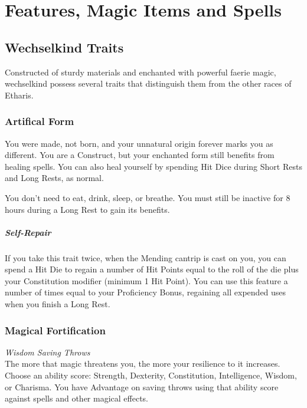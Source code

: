 \documentclass[letterpaper,openany,oneside,twocolumn]{book}
\begin{document}
\onecolumn


\rendercharactersheet

\renderbackgroundsheet

\renderspellsheet


\restoregeometry
\twocolumn

\chapter*{Features, Magic Items and Spells}

\section*{Wechselkind Traits}
Constructed of sturdy materials and enchanted with powerful faerie magic, wechselkind possess several traits that distinguish them from the other races of Etharis.
\subsection*{Artifical Form}
You were made, not born, and your unnatural origin forever marks you as different. You are a Construct, but your enchanted form still benefits from healing spells. You can also heal yourself by spending Hit Dice during Short Rests and Long Rests, as normal.

You don't need to eat, drink, sleep, or breathe. You must still be inactive for 8 hours during a Long Rest to gain its benefits.
\paragraph*{Self-Repair} If you take this trait twice, when the Mending cantrip is cast on you, you can spend a Hit Die to regain a number of Hit Points equal to the roll of the die plus your Constitution modifier (minimum 1 Hit Point). You can use this feature a number of times equal to your Proficiency Bonus, regaining all expended uses when you finish a Long Rest.
\subsection*{Magical Fortification}
\textit{Wisdom Saving Throws}\\
The more that magic threatens you, the more your resilience to it increases. Choose an ability score: Strength, Dexterity, Constitution, Intelligence, Wisdom, or Charisma. You have Advantage on saving throws using that ability score against spells and other magical effects.
\end{document}
